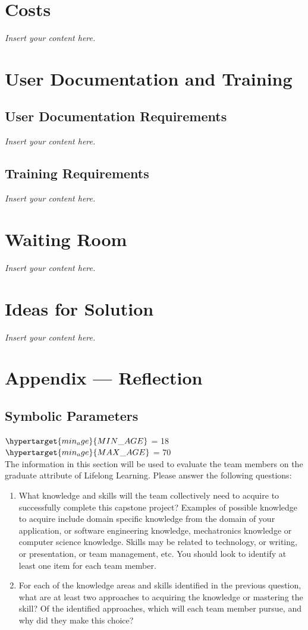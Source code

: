 \documentclass[12pt]{article}
\newcommand{\lips}{\textit{Insert your content here.}}
\begin{document}
\section{Costs}
\lips
\section{User Documentation and Training}
\subsection{User Documentation Requirements}
\lips
\subsection{Training Requirements}
\lips

\section{Waiting Room}
\lips

\section{Ideas for Solution}
\lips

\newpage{}
\section*{Appendix --- Reflection}
\subsection{Symbolic Parameters}
$\hypertarget{min_age}{MIN\_AGE}$ = 18\\
$\hypertarget{min_age}{MAX\_AGE}$ = 70\\

The information in this section will be used to evaluate the team members on the
graduate attribute of Lifelong Learning.  Please answer the following questions:

\begin{enumerate}
  \item What knowledge and skills will the team collectively need to acquire to
  successfully complete this capstone project?  Examples of possible knowledge
  to acquire include domain specific knowledge from the domain of your
  application, or software engineering knowledge, mechatronics knowledge or
  computer science knowledge.  Skills may be related to technology, or writing,
  or presentation, or team management, etc.  You should look to identify at
  least one item for each team member.
  \item For each of the knowledge areas and skills identified in the previous
  question, what are at least two approaches to acquiring the knowledge or
  mastering the skill?  Of the identified approaches, which will each team
  member pursue, and why did they make this choice?
\end{enumerate}
\end{document}

